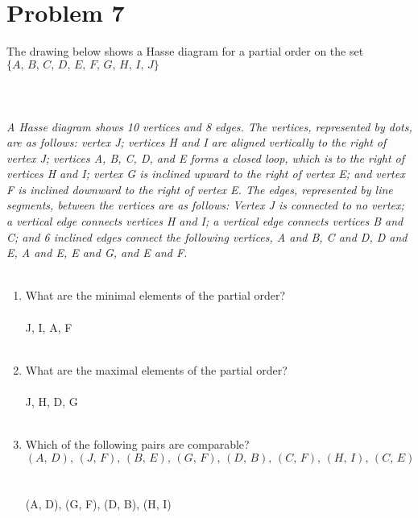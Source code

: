 \documentclass{amsart}
\theoremstyle{definition}
\theoremstyle{Exercise}
\theoremstyle{remark}
\theoremstyle{rule}
\numberwithin{equation}{section}
\begin{document}
\section*{Problem 7}
The drawing below shows a Hasse diagram for a partial order on the set $\{A,\, B,\, C,\, D,\, E,\, F,\, G,\, H,\, I,\, J\}$
\\
\\
\\
\\
{\color{blue}{\bf Figure 3:} \emph{A Hasse diagram shows 10 vertices and 8 edges. The vertices, represented by dots, are as follows: vertex J; vertices H and I are aligned vertically to the right of vertex J; vertices A, B, C, D, and E forms a closed loop, which is to the right of vertices H and I; vertex G is inclined upward to the right of vertex E; and vertex F is inclined downward to the right of vertex E. The edges, represented by line segments, between the vertices are as follows: Vertex J is connected to no vertex; a vertical edge connects vertices H and I; a vertical edge connects vertices B and C; and 6 inclined edges connect the following vertices, A and B, C and D, D and E, A and E, E and G, and E and F.
}
}
\\
\\

\begin{enumerate}[label=(\alph*)]
\item What are the minimal elements of the partial order?\\\\
J, I, A, F
\\\\

\item What are the maximal elements of the partial order?\\\\
J, H, D, G
\\\\

\item Which of the following pairs are comparable?\\
\[
(A, \,D),\, (J,\, F),\, (B,\, E),\, (G, \,F),\, (D,\, B),\, (C, \,F),\, (H,\, I), \,(C,\, E)
\]\\\\
(A, D), (G, F), (D, B), (H, I)
\\\\

\end{enumerate}
\end{document}
